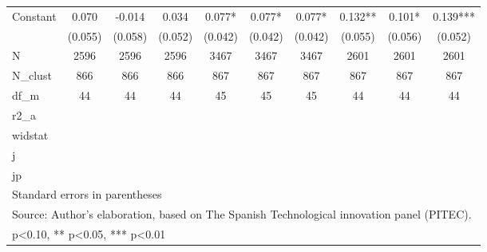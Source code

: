 \begin{table}[htbp]
\begin{tabular}{l*{9}{c}}
Constant            &       0.070   &      -0.014   &       0.034   &       0.077*  &       0.077*  &       0.077*  &       0.132** &       0.101*  &       0.139***\\
                    &     (0.055)   &     (0.058)   &     (0.052)   &     (0.042)   &     (0.042)   &     (0.042)   &     (0.055)   &     (0.056)   &     (0.052)   \\
\hline
N                   &        2596   &        2596   &        2596   &        3467   &        3467   &        3467   &        2601   &        2601   &        2601   \\
N\_clust             &         866   &         866   &         866   &         867   &         867   &         867   &         867   &         867   &         867   \\
df\_m                &          44   &          44   &          44   &          45   &          45   &          45   &          44   &          44   &          44   \\
r2\_a                &               &               &               &               &               &               &               &               &               \\
widstat             &               &               &               &               &               &               &               &               &               \\
j                   &               &               &               &               &               &               &               &               &               \\
jp                  &               &               &               &               &               &               &               &               &               \\
\hline\hline
\multicolumn{10}{l}{\footnotesize Standard errors in parentheses}\\
\multicolumn{10}{l}{\footnotesize Source: Author's elaboration, based on The Spanish Technological innovation panel (PITEC).}\\
\multicolumn{10}{l}{\footnotesize * p<0.10, ** p<0.05, *** p<0.01}\\
\end{tabular}
\end{table}
